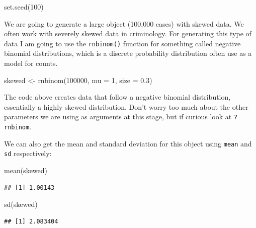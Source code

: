\documentclass[
]{book}
\newenvironment{Shaded}{\begin{snugshade}}{\end{snugshade}}
\newcommand{\AttributeTok}[1]{\textcolor[rgb]{0.77,0.63,0.00}{#1}}
\newcommand{\DecValTok}[1]{\textcolor[rgb]{0.00,0.00,0.81}{#1}}
\newcommand{\FloatTok}[1]{\textcolor[rgb]{0.00,0.00,0.81}{#1}}
\newcommand{\FunctionTok}[1]{\textcolor[rgb]{0.00,0.00,0.00}{#1}}
\newcommand{\NormalTok}[1]{#1}
\newcommand{\OtherTok}[1]{\textcolor[rgb]{0.56,0.35,0.01}{#1}}
\begin{document}
\begin{Shaded}
\begin{Highlighting}[]
\FunctionTok{set.seed}\NormalTok{(}\DecValTok{100}\NormalTok{) }
\end{Highlighting}
\end{Shaded}

We are going to generate a large object (100,000 cases) with skewed data. We often work with severely skewed data in criminology. For generating this type of data I am going to use the \texttt{rnbinom()} function for something called negative binomial distributions, which is a discrete probability distribution often use as a model for counts.

\begin{Shaded}
\begin{Highlighting}[]
\NormalTok{skewed }\OtherTok{\textless{}{-}} \FunctionTok{rnbinom}\NormalTok{(}\DecValTok{100000}\NormalTok{, }\AttributeTok{mu =} \DecValTok{1}\NormalTok{, }\AttributeTok{size =} \FloatTok{0.3}\NormalTok{) }
\end{Highlighting}
\end{Shaded}

The code above creates data that follow a negative binomial distribution, essentially a highly skewed distribution. Don't worry too much about the other parameters we are using as arguments at this stage, but if curious look at \texttt{?rnbinom}.

We can also get the mean and standard deviation for this object using \texttt{mean} and \texttt{sd} respectively:

\begin{Shaded}
\begin{Highlighting}[]
\FunctionTok{mean}\NormalTok{(skewed)}
\end{Highlighting}
\end{Shaded}

\begin{verbatim}
## [1] 1.00143
\end{verbatim}

\begin{Shaded}
\begin{Highlighting}[]
\FunctionTok{sd}\NormalTok{(skewed)}
\end{Highlighting}
\end{Shaded}

\begin{verbatim}
## [1] 2.083404
\end{verbatim}
\end{document}
